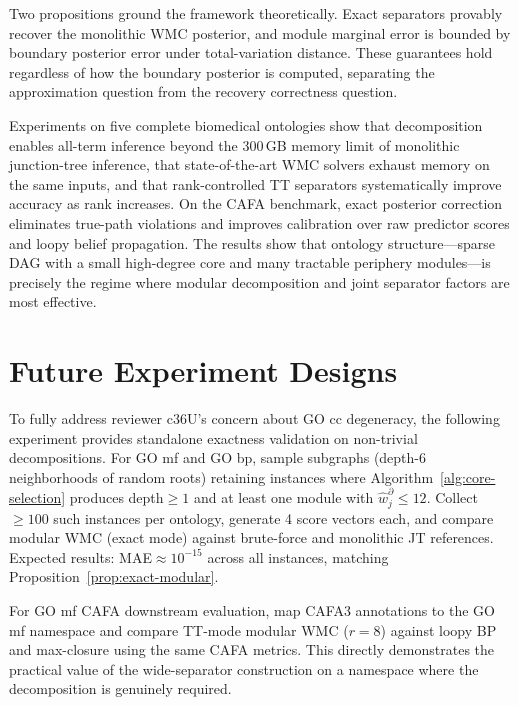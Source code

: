\documentclass[12pt]{article}
\begin{document}
Two propositions ground the framework theoretically. Exact separators
provably recover the monolithic WMC posterior, and module marginal
error is bounded by boundary posterior error under total-variation
distance. These guarantees hold regardless of how the boundary
posterior is computed, separating the approximation question from the
recovery correctness question.

Experiments on five complete biomedical ontologies show that
decomposition enables all-term inference beyond the 300\,GB memory
limit of monolithic junction-tree inference, that state-of-the-art WMC
solvers exhaust memory on the same inputs, and that rank-controlled TT
separators systematically improve accuracy as rank increases. On the
CAFA benchmark, exact posterior correction eliminates true-path
violations and improves calibration over raw predictor scores and loopy
belief propagation. The results show that ontology structure---sparse
DAG with a small high-degree core and many tractable periphery
modules---is precisely the regime where modular decomposition and
joint separator factors are most effective.



\appendix

\section{Future Experiment Designs}
\label{app:future-experiments}

To fully address reviewer c36U's concern about GO cc degeneracy, the
following experiment provides standalone exactness validation on
non-trivial decompositions. For GO mf and GO bp, sample subgraphs
(depth-6 neighborhoods of random roots) retaining instances where
Algorithm~\ref{alg:core-selection} produces depth$\geq 1$ and at least
one module with $\widehat{w}_j^\partial\leq 12$. Collect $\geq 100$
such instances per ontology, generate 4 score vectors each, and compare
modular WMC (exact mode) against brute-force and monolithic JT
references. Expected results: MAE$\approx 10^{-15}$ across all
instances, matching Proposition~\ref{prop:exact-modular}.

For GO mf CAFA downstream evaluation, map CAFA3 annotations to the GO
mf namespace and compare TT-mode modular WMC ($r=8$) against loopy BP
and max-closure using the same CAFA metrics. This directly demonstrates
the practical value of the wide-separator construction on a namespace
where the decomposition is genuinely required.
\end{document}
